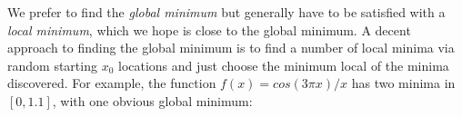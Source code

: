 \documentclass[titlepage]{tufte-book}
\begin{document}
\begin{fullwidth}
We prefer to find the {\em global minimum} but generally have to be satisfied with a {\em local minimum}, which we hope is close to the global minimum. A decent approach to finding the global minimum is to find a number of local minima via random starting $x_0$ locations and just choose the minimum local of the minima discovered. For example, the function $f(x) = cos(3\pi x) / x$ has two minima in $[0,1.1]$, with one obvious global minimum:

\begin{center}
\end{center}


\end{fullwidth}
\end{document}
